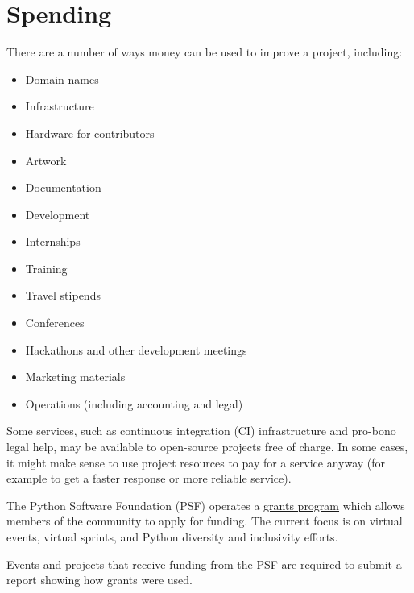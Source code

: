 


\chapter{Spending}

There are a number of ways money can be used to improve a project, including:

\begin{itemize}

\item Domain names
\item Infrastructure
\item Hardware for contributors
\item Artwork
\item Documentation
\item Development
\item Internships
\item Training
\item Travel stipends
\item Conferences
\item Hackathons and other development meetings
\item Marketing materials
\item Operations (including accounting and legal)

\end{itemize}

Some services, such as continuous integration (CI) infrastructure and pro-bono legal help, may be available to open-source projects free of charge.  In some cases, it might make sense to use project resources to pay for a service anyway (for example to get a faster response or more reliable service).

\begin{kaobox}[frametitle=PSF Grants Program]

The Python Software Foundation (PSF) operates a \href{https://www.python.org/psf/grants/}{grants program} which allows members of the community to apply for funding.  The current focus is on virtual events, virtual sprints, and Python diversity and inclusivity efforts.

Events and projects that receive funding from the PSF are required to submit a report showing how grants were used.

\end{kaobox}

